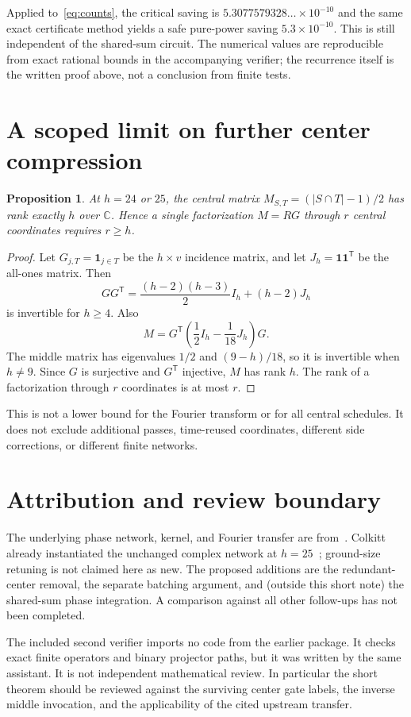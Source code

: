 \documentclass[11pt]{article}
\newtheorem{proposition}{Proposition}
\newcommand{\C}{\mathbb C}
\begin{document}
Applied to~\eqref{eq:counts}, the critical saving is $5.3077579328\ldots\times10^{-10}$ and the same exact certificate method yields a safe pure-power saving $5.3\times10^{-10}$. This is still independent of the shared-sum circuit. The numerical values are reproducible from exact rational bounds in the accompanying verifier; the recurrence itself is the written proof above, not a conclusion from finite tests.

\section{A scoped limit on further center compression}
\begin{proposition}
At $h=24$ or $25$, the central matrix $M_{S,T}=(|S\cap T|-1)/2$ has rank exactly $h$ over $\C$. Hence a single factorization $M=RG$ through $r$ central coordinates requires $r\ge h$.
\end{proposition}
\begin{proof}
Let $G_{j,T}=\mathbf1_{j\in T}$ be the $h\times v$ incidence matrix, and let $J_h=\mathbf1\mathbf1^{\mathsf T}$ be the all-ones matrix. Then
\[
 GG^{\mathsf T}=\frac{(h-2)(h-3)}2 I_h+(h-2)J_h
\]
is invertible for $h\ge4$. Also
\[
 M=G^{\mathsf T}\left(\frac12I_h-\frac1{18}J_h\right)G.
\]
The middle matrix has eigenvalues $1/2$ and $(9-h)/18$, so it is invertible when $h\ne9$. Since $G$ is surjective and $G^{\mathsf T}$ injective, $M$ has rank $h$. The rank of a factorization through $r$ coordinates is at most $r$.
\end{proof}
This is not a lower bound for the Fourier transform or for all central schedules. It does not exclude additional passes, time-reused coordinates, different side corrections, or different finite networks.

\section*{Attribution and review boundary}
The underlying phase network, kernel, and Fourier transfer are from~\cite{O}. Colkitt already instantiated the unchanged complex network at $h=25$~\cite{D}; ground-size retuning is not claimed here as new. The proposed additions are the redundant-center removal, the separate batching argument, and (outside this short note) the shared-sum phase integration. A comparison against all other follow-ups has not been completed.

The included second verifier imports no code from the earlier package. It checks exact finite operators and binary projector paths, but it was written by the same assistant. It is not independent mathematical review. In particular the short theorem should be reviewed against the surviving center gate labels, the inverse middle invocation, and the applicability of the cited upstream transfer.
\end{document}
